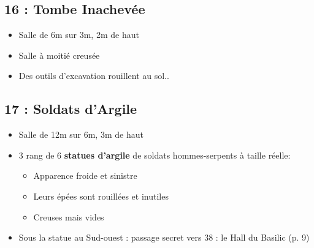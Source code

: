 \subsection{16 : Tombe Inachevée}\label{n2:s16}
\begin{itemize}
  \item Salle de 6m sur 3m, 2m de haut
  \item Salle à moitié creusée
  \item Des outils d’excavation rouillent au sol..
\end{itemize}

\subsection{17 : Soldats d’Argile}\label{n2:s17}
\begin{itemize}
    \item Salle de 12m sur 6m, 3m de haut
    \item 3 rang de 6 \textbf{statues d’argile} de soldats hommes-serpents à taille réelle:
    \begin{itemize}
      \item Apparence froide et sinistre
      \item Leurs épées sont rouillées et inutiles
      \item Creuses mais vides
    \end{itemize}
    \item Sous la statue au Sud-ouest : passage secret vers 38 : le Hall du Basilic (p. 9)
\end{itemize}

